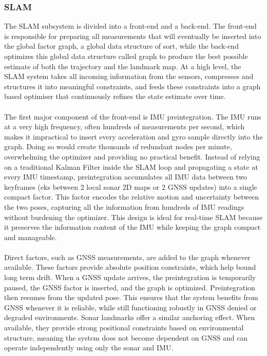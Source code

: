 \subsubsection{SLAM}
The SLAM subsystem is divided into a front-end and a back-end. The front-end is responsible for preparing all measurements that will eventually be inserted into the global factor graph, a global data structure of sort, while the back-end optimizes this global data structure called graph to produce the best possible estimate of both the trajectory and the landmark map. At a high level, the SLAM system takes all incoming information from the sensors, compresses and structures it into meaningful constraints, and feeds these constraints into a graph based optimiser that continuously refines the state estimate over time.
\\ \\
The first major component of the front-end is IMU preintegration. The IMU runs at a very high frequency, often hundreds of measurements per second, which makes it impractical to insert every acceleration and gyro sample directly into the graph. Doing so would create thousands of redundant nodes per minute, overwhelming the optimizer and providing no practical benefit. Instead of relying on a traditional Kalman Filter inside the SLAM loop and propagating a state at every IMU timestamp, preintegration accumulates all IMU data between two keyframes (eks between 2 local sonar 2D maps or 2 GNSS updates) into a single compact factor. This factor encodes the relative motion and uncertainty between the two poses, capturing all the information from hundreds of IMU readings without burdening the optimizer. This design is ideal for real-time SLAM because it preserves the information content of the IMU while keeping the graph compact and manageable.
\\ \\
Direct factors, such as GNSS measurements, are added to the graph whenever available. These factors provide absolute position constraints, which help bound long term drift. When a GNSS update arrives, the preintegration is temporarily paused, the GNSS factor is inserted, and the graph is optimized. Preintegration then resumes from the updated pose. This ensures that the system benefits from GNSS whenever it is reliable, while still functioning robustly in GNSS denied or degraded environments. Sonar landmarks offer a similar anchoring effect. When available, they provide strong positional constraints based on environmental structure, meaning the system does not become dependent on GNSS and can operate independently using only the sonar and IMU.
